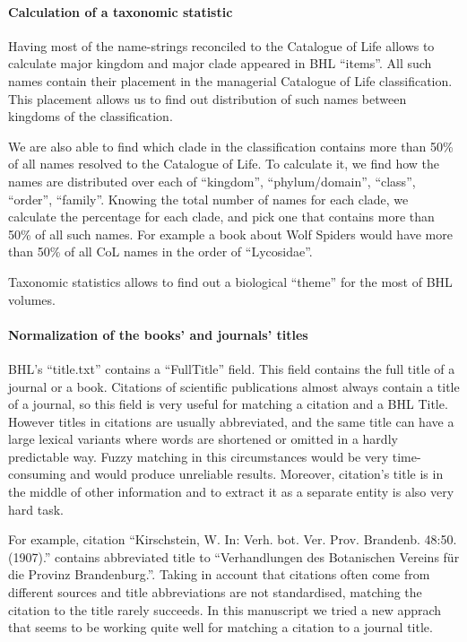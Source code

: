 \documentclass[
]{article}
\begin{document}
\hypertarget{calculation-of-a-taxonomic-statistic}{%
\paragraph{Calculation of a taxonomic
statistic}\label{calculation-of-a-taxonomic-statistic}}

Having most of the name-strings reconciled to the Catalogue of Life
allows to calculate major kingdom and major clade appeared in BHL
``items''. All such names contain their placement in the managerial
Catalogue of Life classification. This placement allows us to find out
distribution of such names between kingdoms of the classification.

We are also able to find which clade in the classification contains more
than 50\% of all names resolved to the Catalogue of Life. To calculate
it, we find how the names are distributed over each of ``kingdom'',
``phylum/domain'', ``class'', ``order'', ``family''. Knowing the total
number of names for each clade, we calculate the percentage for each
clade, and pick one that contains more than 50\% of all such names. For
example a book about Wolf Spiders would have more than 50\% of all CoL
names in the order of ``Lycosidae''.

Taxonomic statistics allows to find out a biological ``theme'' for the
most of BHL volumes.

\hypertarget{normalization-of-the-books-and-journals-titles}{%
\paragraph{Normalization of the books' and journals'
titles}\label{normalization-of-the-books-and-journals-titles}}

BHL's ``title.txt'' contains a ``FullTitle'' field. This field contains
the full title of a journal or a book. Citations of scientific
publications almost always contain a title of a journal, so this field
is very useful for matching a citation and a BHL Title. However titles
in citations are usually abbreviated, and the same title can have a
large lexical variants where words are shortened or omitted in a hardly
predictable way. Fuzzy matching in this circumstances would be very
time-consuming and would produce unreliable results. Moreover,
citation's title is in the middle of other information and to extract it
as a separate entity is also very hard task.

For example, citation ``Kirschstein, W. In: Verh. bot. Ver. Prov.
Brandenb. 48:50. (1907).'' contains abbreviated title to ``Verhandlungen
des Botanischen Vereins für die Provinz Brandenburg.''. Taking in
account that citations often come from different sources and title
abbreviations are not standardised, matching the citation to the title
rarely succeeds. In this manuscript we tried a new apprach that seems to
be working quite well for matching a citation to a journal title.
\end{document}
